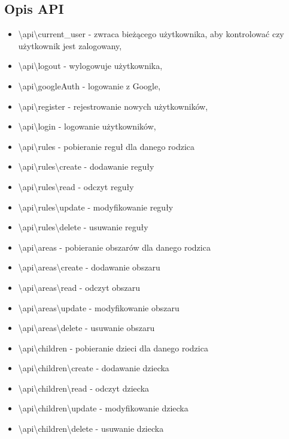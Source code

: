 \documentclass{sprawozdanie-agh}
\begin{document}
		\subsection{Opis API}
		\begin{itemize}
			\item \textbackslash api\textbackslash current\_user - zwraca bieżącego użytkownika, aby kontrolować czy użytkownik jest zalogowany,
			\item \textbackslash api\textbackslash logout - wylogowuje użytkownika,
			\item \textbackslash api\textbackslash googleAuth - logowanie z Google,
			\item \textbackslash api\textbackslash register - rejestrowanie nowych użytkowników,
			\item \textbackslash api\textbackslash login - logowanie użytkowników,
			
			\item \textbackslash api\textbackslash rules - pobieranie reguł dla danego rodzica
			\item \textbackslash api\textbackslash rules\textbackslash create - dodawanie reguły
			\item \textbackslash api\textbackslash rules\textbackslash read - odczyt reguły
			\item \textbackslash api\textbackslash rules\textbackslash update - modyfikowanie reguły
			\item \textbackslash api\textbackslash rules\textbackslash delete - usuwanie reguły
			
			\item \textbackslash api\textbackslash areas - pobieranie obszarów dla danego rodzica
			\item \textbackslash api\textbackslash areas\textbackslash create - dodawanie obszaru
			\item \textbackslash api\textbackslash areas\textbackslash read - odczyt obszaru
			\item \textbackslash api\textbackslash areas\textbackslash update - modyfikowanie obszaru
			\item \textbackslash api\textbackslash areas\textbackslash delete - usuwanie obszaru
			
			\item \textbackslash api\textbackslash children - pobieranie dzieci dla danego rodzica
			\item \textbackslash api\textbackslash children\textbackslash create - dodawanie dziecka
			\item \textbackslash api\textbackslash children\textbackslash read - odczyt dziecka
			\item \textbackslash api\textbackslash children\textbackslash update - modyfikowanie dziecka
			\item \textbackslash api\textbackslash children\textbackslash delete - usuwanie dziecka
			
		\end{itemize}
		
\end{document}
